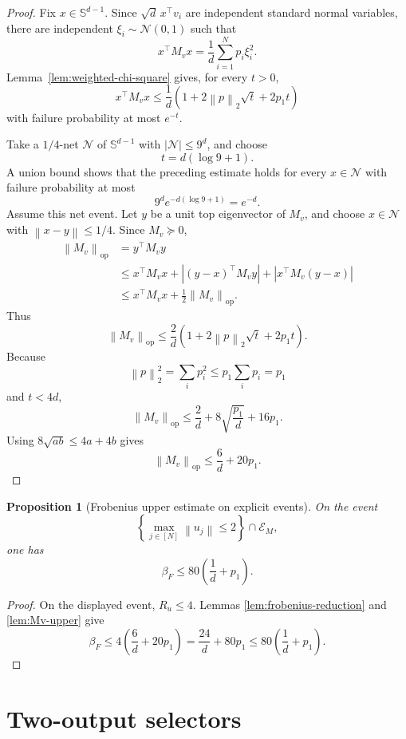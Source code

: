 \documentclass[11pt]{article}
\newtheorem{proposition}[theorem]{Proposition}
\newcommand{\1}{\mathbf{1}}
\newcommand{\op}{\mathrm{op}}
\newcommand{\norm}[1]{\left\|#1\right\|}
\newcommand{\abs}[1]{\left|#1\right|}
\newcommand{\sphere}{\mathbb{S}}
\begin{document}
\begin{proof}
Fix \(x\in\sphere^{d-1}\).  Since
\(\sqrt d\,x^\top v_i\) are independent standard normal variables, there are
independent \(\xi_i\sim\mathcal N(0,1)\) such that
\[
 x^\top M_vx
 =
 \frac1d\sum_{i=1}^N p_i\xi_i^2.
\]
Lemma~\ref{lem:weighted-chi-square} gives, for every \(t>0\),
\[
 x^\top M_vx
 \le
 \frac1d\left(1+2\norm{p}_2\sqrt t+2p_1t\right)
\]
with failure probability at most \(e^{-t}\).

Take a \(1/4\)-net \(\mathcal N\) of \(\sphere^{d-1}\) with
\(\abs{\mathcal N}\le9^d\), and choose
\[
 t=d(\log9+1).
\]
A union bound shows that the preceding estimate holds for every
\(x\in\mathcal N\) with failure probability at most
\[
 9^d e^{-d(\log9+1)}=e^{-d}.
\]
Assume this net event.  Let \(y\) be a unit top eigenvector of \(M_v\), and
choose \(x\in\mathcal N\) with \(\norm{x-y}\le1/4\).  Since \(M_v\succeq0\),
\begin{align*}
 \norm{M_v}_{\op}
 &=y^\top M_vy\\
 &\le
 x^\top M_vx
 +\abs{(y-x)^\top M_vy}
 +\abs{x^\top M_v(y-x)}\\
 &\le
 x^\top M_vx+\frac12\norm{M_v}_{\op}.
\end{align*}
Thus
\[
 \norm{M_v}_{\op}
 \le
 \frac2d\left(1+2\norm{p}_2\sqrt t+2p_1t\right).
\]
Because
\[
 \norm{p}_2^2=\sum_i p_i^2\le p_1\sum_i p_i=p_1
\]
and \(t<4d\),
\[
 \norm{M_v}_{\op}
 \le
 \frac2d+8\sqrt{\frac{p_1}{d}}+16p_1.
\]
Using \(8\sqrt{ab}\le4a+4b\) gives
\[
 \norm{M_v}_{\op}\le\frac6d+20p_1.
\]
\end{proof}

\begin{proposition}[Frobenius upper estimate on explicit events]
\label{prop:frobenius-upper}
On the event
\[
 \left\{\max_{j\in[N]}\norm{u_j}\le2\right\}\cap\mathcal E_M,
\]
one has
\[
 \beta_F\le80\left(\frac1d+p_1\right).
\]
\end{proposition}

\begin{proof}
On the displayed event, \(R_u\le4\).  Lemmas
\ref{lem:frobenius-reduction} and \ref{lem:Mv-upper} give
\[
 \beta_F
 \le
 4\left(\frac6d+20p_1\right)
 =
 \frac{24}{d}+80p_1
 \le
 80\left(\frac1d+p_1\right).
\]
\end{proof}

\section{Two-output selectors}
\label{sec:selectors}
\end{document}
